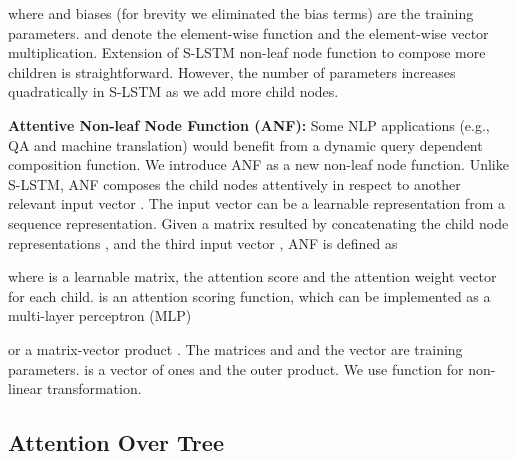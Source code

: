 \documentclass[11pt]{article}
\begin{document}
where  and biases (for brevity we eliminated the bias terms) are the training parameters.   and  denote the element-wise  function and the element-wise vector multiplication. Extension of S-LSTM non-leaf node function to compose more children is straightforward. However, the number of parameters increases quadratically in S-LSTM as we add more child nodes.

\textbf{Attentive Non-leaf Node Function (ANF):} Some NLP applications (e.g., QA and machine translation) would benefit from a dynamic query dependent composition function. We introduce ANF as a new non-leaf node function. Unlike S-LSTM, ANF composes the child nodes attentively in respect to another relevant input vector . The input vector  can be a learnable representation from a sequence representation.
Given a matrix  resulted by concatenating the child node representations ,  and the third input vector , ANF is defined as




where  is a learnable matrix,  the attention score and  the attention weight vector for each child.  is an attention scoring function, which can be implemented as a multi-layer perceptron (MLP)

or a matrix-vector product . The matrices  and  and the vector  are training parameters.  is a vector of ones and  the outer product. We use  function for non-linear transformation.

\subsection{Attention Over Tree}
\end{document}
